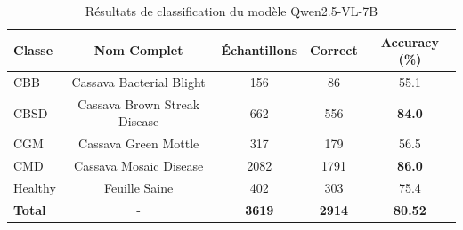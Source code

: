 
\begin{table}[h]
\centering
\caption{Résultats de classification du modèle Qwen2.5-VL-7B}
\label{tab:resultats_qwen}
\begin{tabular}{lcccc}
\hline
\textbf{Classe} & \textbf{Nom Complet} & \textbf{Échantillons} & \textbf{Correct} & \textbf{Accuracy (\%)} \\
\hline
CBB & Cassava Bacterial Blight & 156 & 86 & 55.1 \\
CBSD & Cassava Brown Streak Disease & 662 & 556 & \textbf{84.0} \\
CGM & Cassava Green Mottle & 317 & 179 & 56.5 \\
CMD & Cassava Mosaic Disease & 2082 & 1791 & \textbf{86.0} \\
Healthy & Feuille Saine & 402 & 303 & 75.4 \\
\hline
\textbf{Total} & - & \textbf{3619} & \textbf{2914} & \textbf{80.52} \\
\hline
\end{tabular}
\end{table}
